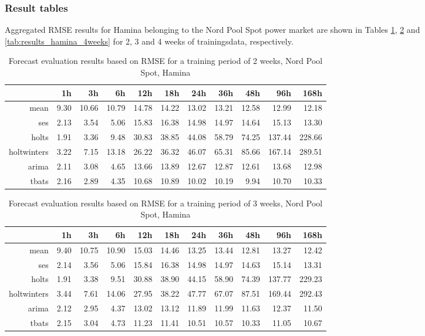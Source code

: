 \subsubsection{Result tables} \label{sssec:result_tables}

Aggregated RMSE results for Hamina belonging to the Nord Pool Spot power market are shown in Tables \ref{tab:results_hamina_2weeks}, \ref{tab:results_hamina_3weeks} and \ref{tab:results_hamina_4weeks} for 2, 3 and 4 weeks of trainingsdata, respectively. 


\begin{table}[ht]
\centering
\begin{tabular}{rrrrrrrrrrr}
  \hline
 & 1h & 3h & 6h & 12h & 18h & 24h & 36h & 48h & 96h & 168h \\ 
  \hline
mean & 9.30 & 10.66 & 10.79 & 14.78 & 14.22 & 13.02 & 13.21 & 12.58 & 12.99 & 12.18 \\ 
  ses & 2.13 & 3.54 & 5.06 & 15.83 & 16.38 & 14.98 & 14.97 & 14.64 & 15.13 & 13.30 \\ 
  holts & 1.91 & 3.36 & 9.48 & 30.83 & 38.85 & 44.08 & 58.79 & 74.25 & 137.44 & 228.66 \\ 
  holtwinters & 3.22 & 7.15 & 13.18 & 26.22 & 36.32 & 46.07 & 65.31 & 85.66 & 167.14 & 289.51 \\ 
  arima & 2.11 & 3.08 & 4.65 & 13.66 & 13.89 & 12.67 & 12.87 & 12.61 & 13.68 & 12.98 \\ 
  tbats & 2.16 & 2.89 & 4.35 & 10.68 & 10.89 & 10.02 & 10.19 & 9.94 & 10.70 & 10.33 \\ 
   \hline
\end{tabular}
\caption{Forecast evaluation results based on RMSE for a training period of 2 weeks, Nord Pool Spot, Hamina}
\label{tab:results_hamina_2weeks}
\end{table}
\begin{table}[ht]
\centering
\begin{tabular}{rrrrrrrrrrr}
  \hline
 & 1h & 3h & 6h & 12h & 18h & 24h & 36h & 48h & 96h & 168h \\ 
  \hline
mean & 9.40 & 10.75 & 10.90 & 15.03 & 14.46 & 13.25 & 13.44 & 12.81 & 13.27 & 12.42 \\ 
  ses & 2.14 & 3.56 & 5.06 & 15.84 & 16.38 & 14.98 & 14.97 & 14.63 & 15.14 & 13.31 \\ 
  holts & 1.91 & 3.38 & 9.51 & 30.88 & 38.90 & 44.15 & 58.90 & 74.39 & 137.77 & 229.23 \\ 
  holtwinters & 3.44 & 7.61 & 14.06 & 27.95 & 38.22 & 47.77 & 67.07 & 87.51 & 169.44 & 292.43 \\ 
  arima & 2.12 & 2.95 & 4.37 & 13.02 & 13.12 & 11.89 & 11.99 & 11.63 & 12.37 & 11.50 \\ 
  tbats & 2.15 & 3.04 & 4.73 & 11.23 & 11.41 & 10.51 & 10.57 & 10.33 & 11.05 & 10.67 \\ 
   \hline
\end{tabular}
\caption{Forecast evaluation results based on RMSE for a training period of 3 weeks, Nord Pool Spot, Hamina}
\label{tab:results_hamina_3weeks}
\end{table}
